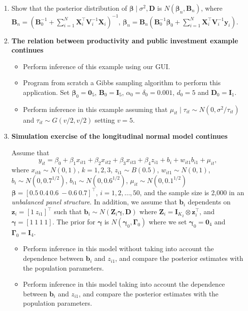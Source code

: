\begin{enumerate}
	
	\item Show that the posterior distribution of $\bm{\beta}\mid \sigma^2,\bm{D}$ is $N(\bm{\beta}_n,\bm{B}_n)$, where $\bm{B}_n = (\bm{B}_0^{-1} +\sum_{i=1}^N \bm{X}_i^{\top}\bm{V}_i^{-1}\bm{X}_i)^{-1}$, $\bm{\beta}_n= \bm{B}_n(\bm{B}_0^{-1}\bm{\beta}_0 + \sum_{i=1}^N\bm{X}_i^{\top}\bm{V}_i^{-1}\bm{y}_i)$.
	
	\item \textbf{The relation between productivity and public investment example continues}
	
	\begin{itemize}
		\item Perform inference of this example using our GUI.
		\item Program from scratch a Gibbs sampling algorithm to perform this application. Set $\bm{\beta}_0=\bm{0}_5$, $\bm{B}_0=\bm{I}_5$, $\alpha_0=\delta_0=0.001$, $d_0=5$ and $\bm{D}_0=\bm{I}_1$.
		\item Perform inference in this example assuming that $\mu_{it}\mid \tau_{it}\sim N(0, \sigma^2/\tau_{it})$ and $\tau_{it}\sim G(v/2,v/2)$ setting $v=5$. 
	\end{itemize}
  
	\item \textbf{Simulation exercise of the longitudinal normal model continues}
	
	
	Assume that 
	\[y_{it}=\beta_0+\beta_1x_{it1}+\beta_2x_{it2}+\beta_3x_{it3}+\beta_4 z_{i1}+b_i+w_{it1}b_{i1}+\mu_{it},\]
	where $x_{itk}\sim N(0,1)$, $k=1,2,3$, $z_{i1}\sim B(0.5)$, $w_{it1}\sim N(0,1)$, $b_i\sim N(0, 0.7^{1/2})$, $b_{i1}\sim N(0, 0.6^{1/2})$, $\mu_{it}\sim N(0, 0.1^{1/2})$ $\bm{\beta}=[0.5 \ 0.4 \ 0.6 \ -0.6 \ 0.7]^{\top}$, $i=1,2,\dots,50$, and the sample size is 2,000 in an \textit{unbalanced panel structure}. In addition, we assume that $\bm{b}_i$ dependents on $\bm{z}_i=[1 \ z_{i1}]^{\top}$ such that $\bm{b}_i\sim N(\bm{Z}_i\bm{\gamma},\bm{D})$ where $\bm{Z}_i=\bm{I}_{K_2}\otimes \bm{z}_i^{\top}$, and $\bm{\gamma}=[1 \ 1 \ 1 \ 1]$. The prior for $\bm{\gamma}$ is $N(\bm{\gamma}_0,\bm{\Gamma}_0)$ where we set $\bm{\gamma}_0=\bm{0}_4$ and $\bm{\Gamma}_0=\bm{I}_4$. 
	
	\begin{itemize}
		\item Perform inference in this model without taking into account the dependence between $\bm{b}_i$ and $z_{i1}$, and compare the posterior estimates with the population parameters.
		\item Perform inference in this model taking into account the dependence between $\bm{b}_i$ and $z_{i1}$, and compare the posterior estimates with the population parameters. 
	\end{itemize}


\end{enumerate}
